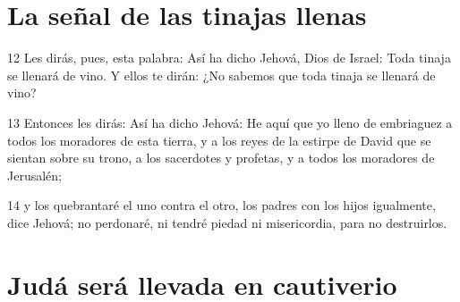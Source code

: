 \section*{La señal de las tinajas llenas}

\par 12 Les dirás, pues, esta palabra: Así ha dicho Jehová, Dios de Israel: Toda tinaja se llenará de vino. Y ellos te dirán: ¿No sabemos que toda tinaja se llenará de vino?
\par 13 Entonces les dirás: Así ha dicho Jehová: He aquí que yo lleno de embriaguez a todos los moradores de esta tierra, y a los reyes de la estirpe de David que se sientan sobre su trono, a los sacerdotes y profetas, y a todos los moradores de Jerusalén;
\par 14 y los quebrantaré el uno contra el otro, los padres con los hijos igualmente, dice Jehová; no perdonaré, ni tendré piedad ni misericordia, para no destruirlos.

\section*{Judá será llevada en cautiverio}

